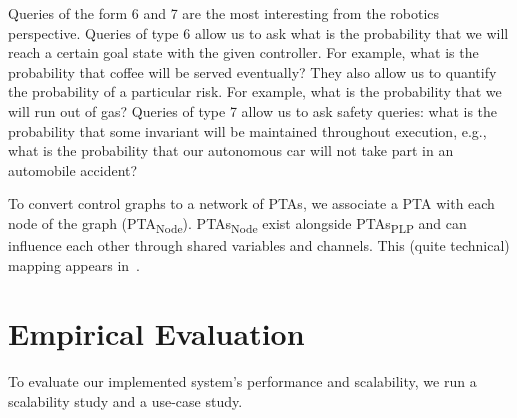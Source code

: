 \documentclass[letterpaper]{article}
\newcommand{\frameImage}[4]{
\begin{figure}[H] 
  \centerline{
    \fcolorbox{frameColor}{white}{
        \texttt{[image: \#1]} } }
    \caption{#4}
    \label{fig:#1}
\end{figure}
}
\begin{document}
Queries of the form 6 and 7 are the most interesting from the robotics perspective. Queries of type 6 allow us to ask what is the probability that we will reach a certain goal state with the given controller. For example, what is the probability that coffee will be served eventually? They also allow us to quantify the probability of a particular risk.
For example, what is the probability that we will run out of gas? Queries of type 7 allow us to ask safety queries: what is the probability that some invariant will be maintained throughout execution, e.g., what is the probability that our autonomous car will not take part in an automobile accident?

To convert control graphs to a network of PTAs, we associate a PTA with each node of the graph (PTA\textsubscript{Node}). PTAs\textsubscript{Node} exist alongside PTAs\textsubscript{PLP} and can influence each other through shared variables and channels.
This (quite technical) mapping appears in~\cite{kovalchu2018}. 





\section{Empirical Evaluation}
To evaluate our implemented system's performance and scalability,
we run a scalability study and a use-case study.




%


%



\end{document}
